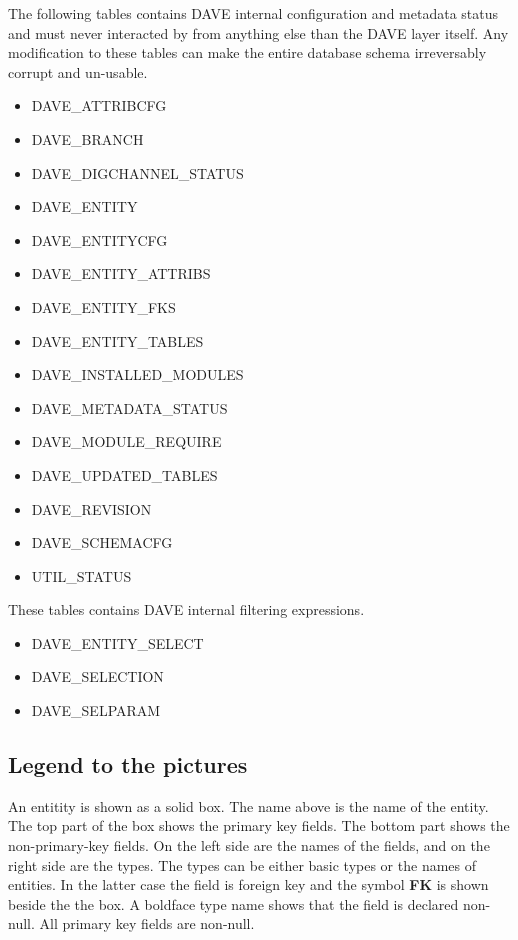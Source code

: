 \documentclass[techdoc]{nobs}   %
\begin{document}
The following tables contains DAVE internal configuration and metadata status and must never interacted by from anything else than the DAVE layer itself. Any modification to these tables can make the entire database schema irreversably corrupt and un-usable.
\begin{itemize}
\item DAVE\_ATTRIBCFG
\item DAVE\_BRANCH
\item DAVE\_DIGCHANNEL\_STATUS
\item DAVE\_ENTITY
\item DAVE\_ENTITYCFG
\item DAVE\_ENTITY\_ATTRIBS
\item DAVE\_ENTITY\_FKS
\item DAVE\_ENTITY\_TABLES
\item DAVE\_INSTALLED\_MODULES
\item DAVE\_METADATA\_STATUS
\item DAVE\_MODULE\_REQUIRE
\item DAVE\_UPDATED\_TABLES
\item DAVE\_REVISION
\item DAVE\_SCHEMACFG
\item UTIL\_STATUS
\end{itemize}

These tables contains DAVE internal filtering expressions.
\begin{itemize}
\item DAVE\_ENTITY\_SELECT
\item DAVE\_SELECTION
\item DAVE\_SELPARAM
\end{itemize}
\newpage

\subsection{Legend to the pictures}
\label{sec:legend}

An entitity is shown as a solid box. The name above is the name of the entity.
The top part of the box shows the primary key fields. The bottom part shows
the non-primary-key fields. On the left side are the names of the fields, and
on the right side are the types. The types can be either basic types or the names
of entities. In the latter case the field is foreign key and the symbol {\bf FK}
is shown beside the the box. A boldface type name shows that the field is
declared non-null. All primary key fields are non-null.
\end{document}
